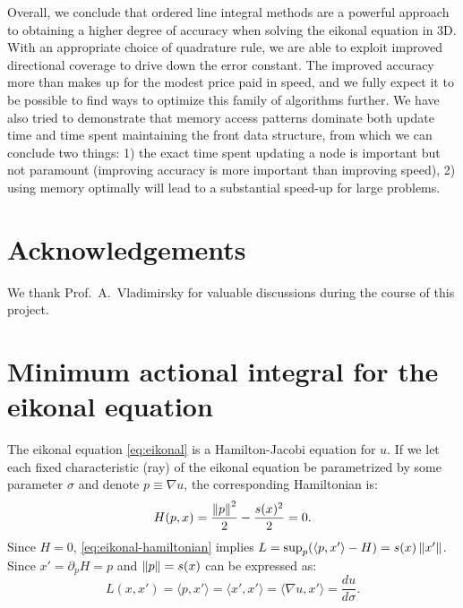 \documentclass{article}
\begin{document}
Overall, we conclude that ordered line integral methods are a powerful
approach to obtaining a higher degree of accuracy when solving the
eikonal equation in 3D. With an appropriate choice of quadrature rule,
we are able to exploit improved directional coverage to drive down the
error constant. The improved accuracy more than makes up for the
modest price paid in speed, and we fully expect it to be possible to
find ways to optimize this family of algorithms further. We have also
tried to demonstrate that memory access patterns dominate both update
time and time spent maintaining the front data structure, from which
we can conclude two things: 1) the exact time spent updating a node is
important but not paramount (improving accuracy is more important than
improving speed), 2) using memory optimally will lead to a substantial
speed-up for large problems.

\section{Acknowledgements}

We thank Prof.\ A.\ Vladimirsky for valuable discussions during the
course of this project.

\appendix

\section[Minimum action integral]{Minimum actional integral for the
  eikonal equation}\label{sec:minimum-action-integral} The eikonal
equation \cref{eq:eikonal} is a Hamilton-Jacobi equation for $u$. If
we let each fixed characteristic (ray) of the eikonal equation be
parametrized by some parameter $\sigma$ and denote
$p \equiv \nabla u$, the corresponding Hamiltonian is:
\begin{equation}
  \label{eq:eikonal-hamiltonian}
  H{(p, x)} = \frac{\left\|p\right\|^2}{2} - \frac{s(x)^2}{2} = 0.
\end{equation}
Since $H = 0$, \cref{eq:eikonal-hamiltonian} implies
$L = \sup_p (\langle p, x' \rangle - H) = s(x) \left\|x'\right\|$. Since
$x' = \partial_p H = p$ and $\left\|p\right\| = s(x)$ can be expressed as:
\begin{equation}
  \label{eq:eikonal-lagrangian}
  L(x, x') = \langle p, x'\rangle = \langle x', x'\rangle = \langle \nabla u, x' \rangle = \frac{du}{d\sigma}.
\end{equation}
\end{document}
